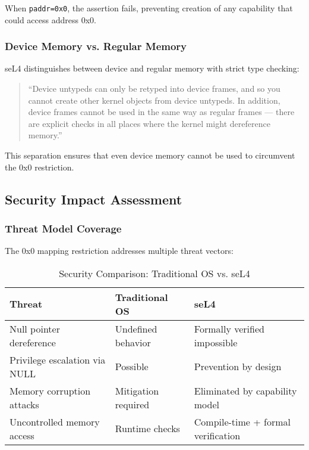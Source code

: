\documentclass[11pt,a4paper]{article}
\begin{document}
When \texttt{paddr=0x0}, the assertion fails, preventing creation of any capability that could access address 0x0.

\subsubsection{Device Memory vs. Regular Memory}

seL4 distinguishes between device and regular memory with strict type checking:

\begin{quote}
``Device untypeds can only be retyped into device frames, and so you cannot create other kernel objects from device untypeds. In addition, device frames cannot be used in the same way as regular frames — there are explicit checks in all places where the kernel might dereference memory.''
\end{quote}

This separation ensures that even device memory cannot be used to circumvent the 0x0 restriction.

\subsection{Security Impact Assessment}

\subsubsection{Threat Model Coverage}

The 0x0 mapping restriction addresses multiple threat vectors:

\begin{table}[h]
\centering
\begin{tabular}{|l|l|l|}
\hline
\textbf{Threat} & \textbf{Traditional OS} & \textbf{seL4} \\
\hline
Null pointer dereference & Undefined behavior & Formally verified impossible \\
Privilege escalation via NULL & Possible & Prevention by design \\
Memory corruption attacks & Mitigation required & Eliminated by capability model \\
Uncontrolled memory access & Runtime checks & Compile-time + formal verification \\
\hline
\end{tabular}
\caption{Security Comparison: Traditional OS vs. seL4}
\end{table}
\end{document}
